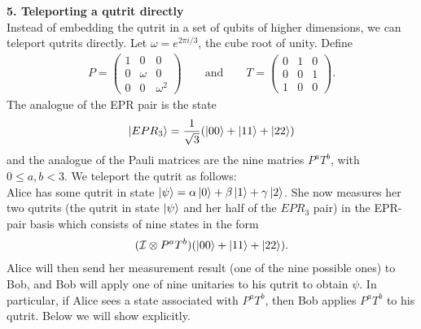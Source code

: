 \documentclass{article}
\theoremstyle{definition}
\newcommand{\al}{\alpha}
\newcommand{\be}{\beta}
\newcommand{\f}[2]{\frac{#1}{#2}}
\newcommand{\Id}{\mathcal{I}}
\begin{document}
\noindent \textbf{5. Teleporting a qutrit directly}\\

\noindent Instead of embedding the qutrit in a set of qubits of higher dimensions, we can teleport qutrits directly. Let $\omega = e^{2\pi i /3}$, the cube root of unity. Define 
\begin{align*}
	P = \begin{pmatrix}
		1 & 0 & 0 \\ 0 & \omega & 0 \\ 0 & 0 & \omega^2  
	\end{pmatrix} \quad \quad \text{and} \quad\quad 
	T = \begin{pmatrix}
		0 & 1 & 0 \\ 0 & 0 & 1 \\ 1 & 0 & 0
	\end{pmatrix}.
\end{align*}
The analogue of the EPR pair is the state
\begin{align*}
	\ket{EPR_3} = \f{1}{\sqrt{3}}(\ket{00} + \ket{11} + \ket{22})
\end{align*}
and the analogue of the Pauli matrices are the nine matries $P^aT^b$, with $0 \leq a,b< 3$.  We teleport the qutrit as follows:\\

\noindent Alice has some qutrit in state $\ket{\psi} = \al \ket{0} + \be \ket{1} + \gamma \ket{2}$. She now measures her two qutrits (the qutrit in state $\ket{\psi}$ and her half of the $EPR_3$ pair) in the EPR-pair basis which consists of nine states in the form
\begin{align*}
	(\Id \otimes P^a T^b)(\ket{00} + \ket{11} + \ket{22}).
\end{align*}
Alice will then send her measurement result (one of the nine possible ones) to Bob, and Bob will apply one of nine unitaries to his qutrit to obtain $\psi$. In particular, if Alice sees a state associated with $P^a T^b$, then Bob applies $P^a T^b$ to his qutrit. Below we will show explicitly.\\
\end{document}
